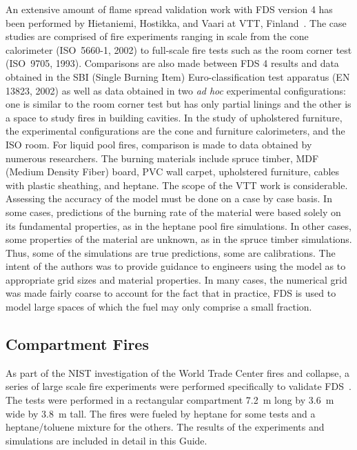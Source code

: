 An extensive  amount of  flame spread validation work with  FDS version 4  has been performed    by   Hietaniemi,    Hostikka,   and    Vaari    at   VTT,
Finland~\cite{Hietaniemi:1}.  The  case studies are  comprised of fire experiments ranging  in scale  from the cone  calorimeter (ISO~5660-1, 2002)
to full-scale fire tests such as the room corner test (ISO~9705, 1993).  Comparisons are  also  made  between FDS  4  results and  data obtained  in
the  SBI (Single  Burning Item)  Euro-classification test apparatus (EN  13823, 2002) as  well as data  obtained in two  {\em ad hoc} experimental
configurations: one is  similar to the  room corner test but  has only partial linings and  the other is a  space to study fires in building
cavities. In the study of upholstered furniture, the experimental configurations  are the cone  and furniture calorimeters, and the  ISO room. For
liquid  pool fires, comparison is  made to data obtained  by  numerous  researchers.   The burning  materials  include spruce  timber, MDF  (Medium
Density  Fiber) board,  PVC  wall carpet, upholstered furniture, cables with plastic sheathing, and heptane.
The scope of the VTT work is considerable. Assessing the accuracy of the model must be done on a case by case basis. In some cases, predictions of
the burning rate of the material were based solely on its fundamental properties, as in the heptane pool fire simulations. In other cases, some
properties of the material are unknown, as in the spruce timber simulations. Thus, some of the simulations are true predictions, some are
calibrations. The intent of the authors was to provide guidance to engineers using the model as to appropriate grid sizes and material properties. In
many cases, the numerical grid was made fairly coarse to account for the fact that in practice, FDS is used to model large spaces of which the fuel
may only comprise a small fraction.



\subsection{Compartment Fires}

As part of the NIST investigation  of the World Trade Center fires and collapse,  a series  of large  scale fire  experiments  were performed
specifically  to  validate  FDS~\cite{NIST_NCSTAR_1-5B}.   The  tests  were performed in  a rectangular  compartment 7.2~m long  by 3.6~m  wide by 3.8~m
tall.   The fires were  fueled by heptane  for some tests  and a heptane/toluene mixture  for the others.  The results of the experiments and simulations
are included in detail in this Guide.

